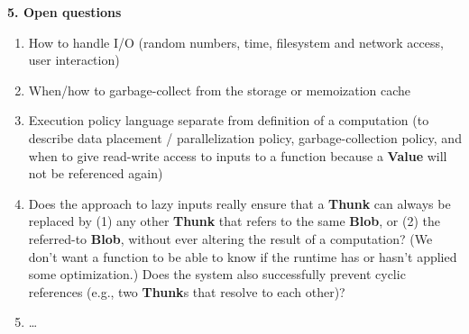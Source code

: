 \documentclass{article}
\newcommand{\blob}{\textbf{Blob}\xspace}
\newcommand{\valuex}{\textbf{Value}\xspace}
\newcommand{\thunk}{\textbf{Thunk}\xspace}
\newcommand{\thunks}{\textbf{Thunk}s\xspace}
\begin{document}
\vspace{0.5\baselineskip}
{\Large \textbf{5. Open questions}}

\begin{enumerate}[topsep=0pt]
\item How to handle I/O (random numbers, time, filesystem and network access, user interaction)

\item When/how to garbage-collect from the storage or memoization cache

\item Execution policy language separate from definition of a
  computation (to describe data placement / parallelization policy,
  garbage-collection policy, and when to give read-write access to
  inputs to a function because a \valuex will not be referenced again)

\item Does the approach to lazy inputs really ensure that a \thunk can
  always be replaced by (1) any other \thunk that refers to the same
  \blob, or (2) the referred-to \blob, without ever altering the
  result of a computation? (We don't want a function to be able to
  know if the runtime has or hasn't applied some optimization.) Does
  the system also successfully prevent cyclic references (e.g., two \thunks that resolve to
  each other)?
  
\item \ldots
  
\end{enumerate}
\end{document}
